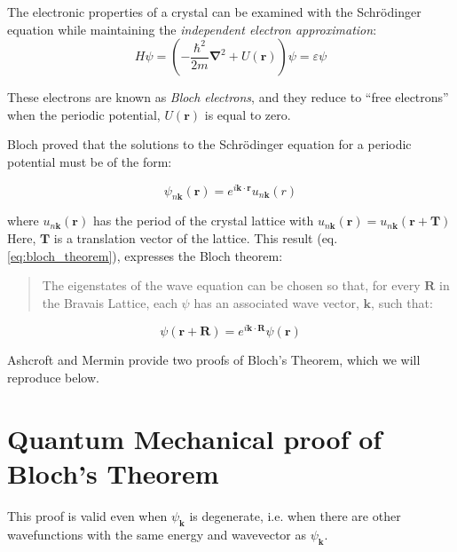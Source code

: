 	The electronic properties of a crystal can be examined with the Schrödinger equation while maintaining the \textit{independent electron approximation}:
	\begin{equation} \label{eq:schrod}
		H\psi=\left(-\frac{\hbar^2}{2m}\boldsymbol{\nabla}^2 + U(\boldsymbol{r})\right)\psi = \varepsilon\psi
	\end{equation}

	These electrons are known as \textit{Bloch electrons}, and they reduce to ``free electrons'' when the periodic potential, $U(\boldsymbol{r})$ is equal to zero.

	Bloch proved that the solutions to the Schrödinger equation for a periodic potential must be of the form:

	\begin{equation} \label{eq:bloch_theorem}
		\psi_{n\boldsymbol{k}}(\boldsymbol{r}) 
		= e^{i\boldsymbol{k} \cdot \boldsymbol{r}}
		u_{n\boldsymbol{k}}(r)
	\end{equation}

	where $u_{n\boldsymbol{k}}(\boldsymbol{r})$ has the period of the crystal lattice with $u_{n\boldsymbol{k}}(\boldsymbol{r}) = u_{n\boldsymbol{k}}(\boldsymbol{r} + \boldsymbol{T})$ 
	Here, $\boldsymbol{T}$ is a translation vector of the lattice. This result (eq. \ref{eq:bloch_theorem}), expresses the Bloch theorem:
	\begin{quotation}
		The eigenstates of the wave equation can be chosen so that, for every $\boldsymbol{R}$ in the Bravais Lattice, each $\psi$ has an associated wave vector, $\boldsymbol{k}$, such that:
	\end{quotation}

	\begin{equation} \label{eq:bloch_theorem_restate}
		\psi(\boldsymbol{r} + \boldsymbol{R})
		= e^{i\boldsymbol{k} \cdot \boldsymbol{R}}
		\psi(\boldsymbol{r})
	\end{equation}


	Ashcroft and Mermin provide two proofs of Bloch's Theorem, which we will reproduce below.

\section{Quantum Mechanical proof of Bloch's Theorem}
	This proof is valid even when $\psi_{\boldsymbol{k}}$ is degenerate,  i.e. when there are other wavefunctions with the same energy and wavevector as $\psi_{\boldsymbol{k}}$.

